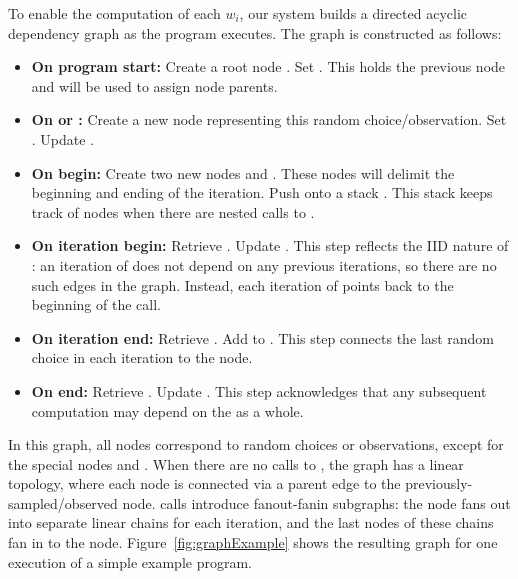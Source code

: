 To enable the computation of each $w_i$, our system builds a directed acyclic dependency graph as the program executes. The graph is constructed as follows:
\begin{itemize}
\item{\textbf{On program start:} Create a root node . Set . This holds the previous node and will be used to assign node parents.}
\item{\textbf{On  or :} Create a new node  representing this random choice/observation. Set . Update .}
\item{\textbf{On  begin:} Create two new nodes  and . These nodes will delimit the beginning and ending of the  iteration. Push  onto a stack . This stack keeps track of  nodes when there are nested calls to .}
\item{\textbf{On  iteration begin:} Retrieve . Update . This step reflects the IID nature of : an iteration of  does not depend on any previous iterations, so there are no such edges in the graph. Instead, each iteration of  points back to the beginning of the  call.}
\item{\textbf{On  iteration end:} Retrieve . Add  to . This step connects the last random choice in each  iteration to the  node.}
\item{\textbf{On  end:} Retrieve . Update . This step acknowledges that any subsequent computation may depend on the  as a whole.}
\end{itemize}
In this graph, all nodes correspond to random choices or observations, except for the special  nodes  and .
When there are no calls to , the graph has a linear topology, where each node is connected via a parent edge to the previously-sampled/observed node.
 calls introduce fanout-fanin subgraphs: the  node fans out into separate linear chains for each  iteration, and the last nodes of these chains fan in to the  node. Figure~\ref{fig:graphExample} shows the resulting graph for one execution of a simple example program.

